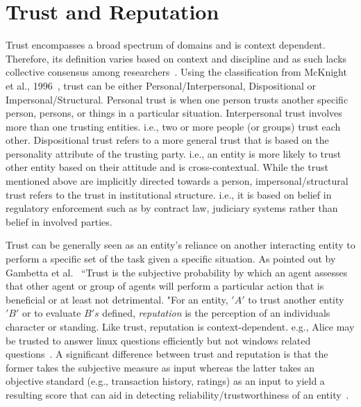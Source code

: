 \section{Trust and Reputation}
Trust encompasses a broad spectrum of domains and is context dependent.
Therefore, its definition varies based on context and discipline and as such
lacks collective consensus among researchers~\cite{mcknight1996meanings}.
Using the classification from McKnight et al., 1996~\cite{mcknight2001trust},
trust can be either Personal/Interpersonal, Dispositional or
Impersonal/Structural. Personal trust is when one person trusts another
specific person, persons, or things in a particular situation. Interpersonal
trust involves more than one trusting entities. i.e., two or more people (or
groups) trust each other. Dispositional trust refers to a more general trust
that is based on the personality attribute of the trusting party. i.e., an
entity is more likely to trust other entity based on their attitude and is
cross-contextual. While the trust mentioned above are implicitly directed
towards a person, impersonal/structural trust refers to the trust in
institutional structure. i.e., it is based on belief in regulatory enforcement
such as by contract law, judiciary systems rather than belief in involved
parties. \par

Trust can be generally seen as an entity's reliance on another interacting
entity to perform a specific set of the task given a specific situation.  As
pointed out by Gambetta et al.~\cite{gambetta2000can} ``Trust is the subjective
probability by which an agent assesses that other agent or group of agents will
perform a particular action that is beneficial or at least not detrimental.
"For an entity, $'A'$ to trust another entity ${'B'}$ or to evaluate $B's$
defined, \textit{reputation} is the perception of an individuals character or
standing. Like trust, reputation is context-dependent. e.g., Alice may be
trusted to answer linux questions efficiently but not windows related
questions~\cite{zacharia2000collaborative}. A significant difference between
trust and reputation is that the former takes the subjective measure as input
whereas the latter takes an objective standard (e.g., transaction history,
ratings) as an input to yield a resulting score that can aid in detecting
reliability/trustworthiness of an
entity~\cite{Sabater2005,castelfranchi2000trust}.\par 

